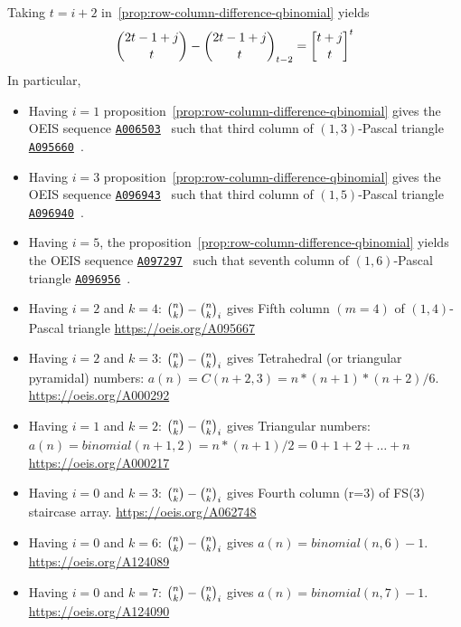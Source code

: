 Taking $t=i+2$ in~\eqref{prop:row-column-difference-qbinomial} yields
\begin{align*}
    \binom{2t-1+j}{t} - \rascalNumber{2t-1+j}{t}{t-2} = \oneQBinomial{t+j}{t}{t}
\end{align*}
In particular,
\begin{itemize}
    \item Having $i=1$ proposition~\eqref{prop:row-column-difference-qbinomial}
    gives the OEIS sequence \href{https://oeis.org/A006503}{\texttt{A006503}}~\cite{sloane1995n}
    such that third column of $(1,3)$-Pascal triangle
    \href{https://oeis.org/A095660}{\texttt{A095660}}~\cite{sloane2004pascal13}.
    \item Having $i=3$ proposition~\eqref{prop:row-column-difference-qbinomial}
    gives the OEIS sequence \href{https://oeis.org/A096943}{\texttt{A096943}}~\cite{sloane2004sixth}
    such that third column of $(1,5)$-Pascal triangle
    \href{https://oeis.org/A096940}{\texttt{A096940}}~\cite{sloane2004pascal}.
    \item Having $i=5$, the proposition~\eqref{prop:row-column-difference-qbinomial} yields
    the OEIS sequence \href{https://oeis.org/A097297}{\texttt{A097297}}~\cite{sloane2004seventh}
    such that seventh column of $(1,6)$-Pascal triangle
    \href{https://oeis.org/A096956}{\texttt{A096956}}~\cite{sloane2004pascal16}.
    \item Having $i=2$ and $k=4$: $\binom{n}{k} - \binom{n}{k}_{i}$ gives
    Fifth column $(m=4)$ of $(1,4)$-Pascal triangle \url{https://oeis.org/A095667}
    \item Having $i=2$ and $k=3$: $\binom{n}{k} - \binom{n}{k}_{i}$ gives
    Tetrahedral (or triangular pyramidal) numbers: $a(n) = C(n+2,3) = n*(n+1)*(n+2)/6$.
    \url{https://oeis.org/A000292}
    \item Having $i=1$ and $k=2$: $\binom{n}{k} - \binom{n}{k}_{i}$ gives
    Triangular numbers: $a(n) = binomial(n+1,2) = n*(n+1)/2 = 0 + 1 + 2 + \dots + n$
    \url{https://oeis.org/A000217}
    \item Having $i=0$ and $k=3$: $\binom{n}{k} - \binom{n}{k}_{i}$ gives
    Fourth column (r=3) of FS(3) staircase array.
    \url{https://oeis.org/A062748}
    \item Having $i=0$ and $k=6$: $\binom{n}{k} - \binom{n}{k}_{i}$ gives
    $a(n) = binomial(n,6)-1$.
    \url{https://oeis.org/A124089}
    \item Having $i=0$ and $k=7$: $\binom{n}{k} - \binom{n}{k}_{i}$ gives
    $a(n) = binomial(n,7)-1$.
    \url{https://oeis.org/A124090}
\end{itemize}
